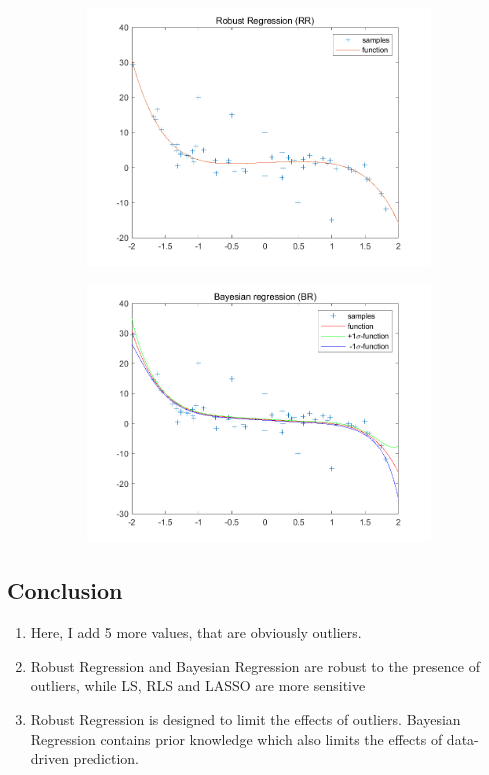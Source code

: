 \documentclass{article}
\begin{document}
\begin{figure}[H]
\begin{subfigure}[b]{0.475\textwidth}
        \includegraphics[width=\textwidth]{fig/1d-rr.png} 
    \end{subfigure}
    \quad
    \begin{subfigure}[b]{0.475\textwidth}   
        \centering 
        \includegraphics[width=\textwidth]{fig/1d-br.png} 
    \end{subfigure}
\end{figure}

\subsection*{Conclusion}
\begin{enumerate}[label=(\roman*)]
    \item Here, I add 5 more values, that are obviously outliers. 
    \item Robust Regression and Bayesian Regression are robust to the presence of outliers, while LS, RLS and LASSO are more sensitive
    \item Robust Regression is designed to limit the effects of outliers. Bayesian Regression contains prior knowledge which also limits the effects of data-driven prediction.
\end{enumerate}
\end{document}
